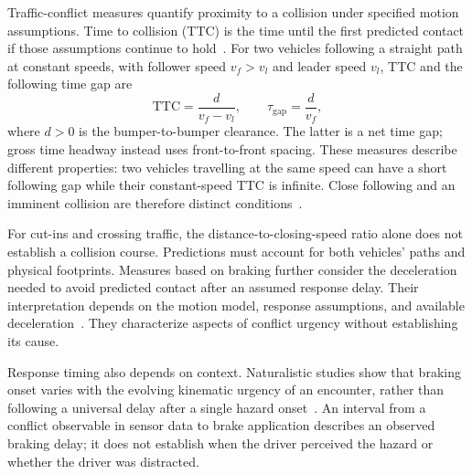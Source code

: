 Traffic-conflict measures quantify proximity to a collision under specified
motion assumptions. Time to collision (TTC) is the time until the first
predicted contact if those assumptions continue to
hold~\cite{hayward1972near-miss}. For two vehicles following a straight path
at constant speeds, with follower speed $v_f>v_l$ and leader speed $v_l$,
TTC and the following time gap are
\begin{equation}
  \mathrm{TTC}=\frac{d}{v_f-v_l},
  \qquad
  \tau_{\mathrm{gap}}=\frac{d}{v_f},
  \label{eq:ttc-time-gap}
\end{equation}
where $d>0$ is the bumper-to-bumper clearance. The latter is a net time gap;
gross time headway instead uses front-to-front spacing. These measures
describe different properties: two vehicles travelling at the same speed
can have a short following gap while their constant-speed TTC is infinite.
Close following and an imminent collision are therefore distinct
conditions~\cite{vogel2003headway}.

For cut-ins and crossing traffic, the distance-to-closing-speed ratio alone
does not establish a collision course. Predictions must account for both
vehicles' paths and physical footprints. Measures based on braking further
consider the deceleration needed to avoid predicted contact after an
assumed response delay. Their interpretation depends on the motion model,
response assumptions, and available deceleration~\cite{westhofen2023criticality}.
They characterize aspects of conflict urgency without establishing its cause.

Response timing also depends on context. Naturalistic studies show that
braking onset varies with the evolving kinematic urgency of an encounter,
rather than following a universal delay after a single hazard
onset~\cite{markkula2016braking}. An interval from a conflict observable
in sensor data to brake application describes an observed braking delay;
it does not establish when the driver perceived the hazard or whether the
driver was distracted.

